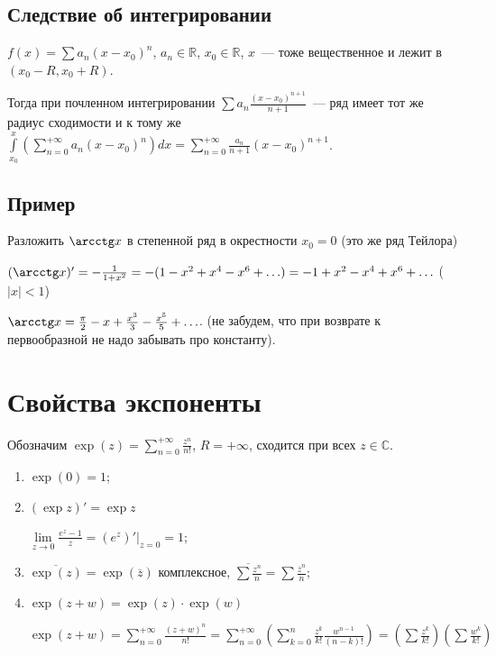 \documentclass{article}
\begin{document}
        \subsection{Следствие об интегрировании}
        
            $f(x) = \sum a_n (x - x_0)^n$, $a_n \in \mathbb{R}$, $x_0 \in \mathbb{R}$, $x$~--- тоже вещественное и лежит в $(x_0 - R, x_0 + R)$.
            
            Тогда при почленном интегрировании $\sum a_n \frac{(x - x_0)^{n + 1}}{n + 1}$~--- ряд имеет тот же радиус сходимости и к тому же $\int\limits^x_{x_0} \left( \sum\limits^{+\infty}_{n = 0} a_n (x - x_0)^n \right) dx = \sum\limits^{+\infty}_{n = 0} \frac{a_n}{n + 1} (x - x_0)^{n + 1}$.
            
        \subsection{Пример}
        
            Разложить $\arcctg x$ в степенной ряд в окрестности $x_0 = 0$ (это же ряд Тейлора)
            
            $(\arcctg x)' = -\frac{1}{1 + x^2} = -(1 - x^2 + x^4 - x^6 + \ldots) = -1 + x^2 - x^4 + x^6 + \ldots$ ($|x| < 1$)
            
            $\arcctg x = \frac{\pi}{2}-x + \frac{x^3}{3} - \frac{x^5}{5} + \ldots$. (не забудем, что при возврате к первообразной не надо забывать про константу).

    \newpage
    
    \section{Свойства экспоненты}
    
        Обозначим $\exp(z) = \sum\limits^{+\infty}_{n = 0} \frac{z^n}{n!}$, $R = +\infty$, сходится при всех $z \in \mathbb{C}$.
        
        \begin{enumerate}
        
            \item $\exp(0) = 1$;
            
            \item $(\exp z)' = \exp z$
            
                $\lim\limits_{z \rightarrow 0} \frac{e^z - 1}{z} = (e^z)' \bigg|_{z = 0} = 1$;
                
            \item $\overline{\exp(z)} = \exp(\overline{z})$ комплексное, $\overline{\sum \frac{z^n}{n}} = \sum \frac{\overline{z}^n}{n}$;
            
            \item $\exp (z + w) = \exp(z) \cdot \exp(w)$
            
                $\exp (z + w) = \sum\limits^{+\infty}_{n = 0} \frac{(z + w)^n}{n!} = \sum\limits^{+\infty}_{n = 0} \left( \sum\limits^n_{k = 0} \frac{z^k}{k!} \frac{w^{n - 1}}{(n - k)!} \right) = \left( \sum \frac{z^k}{k!} \right) \left( \sum \frac{w^k}{k!} \right)$
                
        \end{enumerate}
        
\end{document}
